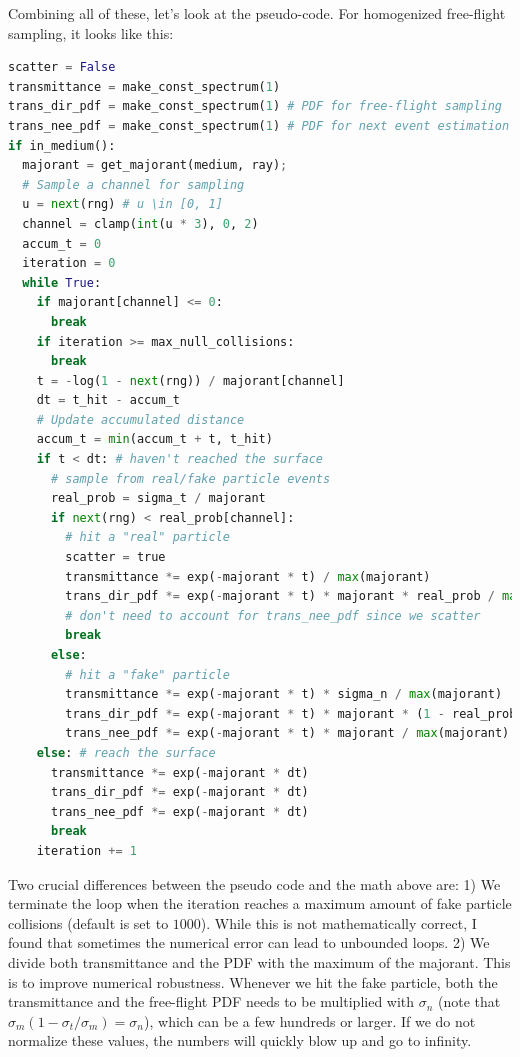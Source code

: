 Combining all of these, let's look at the pseudo-code. For homogenized free-flight sampling, it looks like this:
\begin{lstlisting}[language=python]
scatter = False
transmittance = make_const_spectrum(1)
trans_dir_pdf = make_const_spectrum(1) # PDF for free-flight sampling
trans_nee_pdf = make_const_spectrum(1) # PDF for next event estimation
if in_medium():
  majorant = get_majorant(medium, ray);
  # Sample a channel for sampling
  u = next(rng) # u \in [0, 1]
  channel = clamp(int(u * 3), 0, 2)
  accum_t = 0
  iteration = 0
  while True:
    if majorant[channel] <= 0:
      break
    if iteration >= max_null_collisions:
      break
    t = -log(1 - next(rng)) / majorant[channel]
    dt = t_hit - accum_t
    # Update accumulated distance
    accum_t = min(accum_t + t, t_hit)
    if t < dt: # haven't reached the surface
      # sample from real/fake particle events
      real_prob = sigma_t / majorant
      if next(rng) < real_prob[channel]:
        # hit a "real" particle
        scatter = true
        transmittance *= exp(-majorant * t) / max(majorant)
        trans_dir_pdf *= exp(-majorant * t) * majorant * real_prob / max(majorant)
        # don't need to account for trans_nee_pdf since we scatter
        break
      else:
        # hit a "fake" particle
        transmittance *= exp(-majorant * t) * sigma_n / max(majorant)
        trans_dir_pdf *= exp(-majorant * t) * majorant * (1 - real_prob) / max(majorant)
        trans_nee_pdf *= exp(-majorant * t) * majorant / max(majorant)
    else: # reach the surface
      transmittance *= exp(-majorant * dt)
      trans_dir_pdf *= exp(-majorant * dt)
      trans_nee_pdf *= exp(-majorant * dt)
      break
    iteration += 1
\end{lstlisting}

Two crucial differences between the pseudo code and the math above are:
1) We terminate the loop when the iteration reaches a maximum amount of fake particle collisions 
(default is set to $1000$). While this is not mathematically correct, I found that sometimes
the numerical error can lead to unbounded loops.
2) We divide both transmittance and the PDF with the maximum of the majorant. This is to improve
numerical robustness. Whenever we hit the fake particle, both the transmittance and
the free-flight PDF needs to be multiplied with $\sigma_n$ (note that $\sigma_m (1 - \sigma_t / \sigma_m) = \sigma_n$),
which can be a few hundreds or larger. If we do not normalize these values, the numbers will
quickly blow up and go to infinity.

